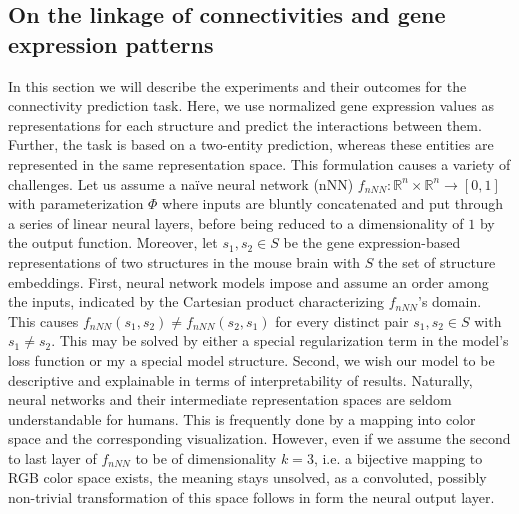 \documentclass[]{article}
\begin{document}
\subsection{On the linkage of connectivities and gene expression patterns}
\label{sec:results_connpred}
In this section we will describe the experiments and their outcomes for the connectivity prediction task. Here, we use normalized gene expression values as representations for each structure and predict the interactions between them. Further, the task is based on a two-entity prediction, whereas these entities are represented in the same representation space. 
This formulation causes a variety of challenges. Let us assume a na\"ive neural network (nNN) $f_{nNN}:\mathbb{R}^n\times \mathbb{R}^n\rightarrow [0,1]$ with parameterization $\Phi$ where inputs are bluntly concatenated and put through a series of linear neural layers, before being reduced to a dimensionality of $1$ by the output function. Moreover, let $s_1, s_2\in S$ be the gene expression-based representations of two structures in the mouse brain with $S$ the set of structure embeddings.
First, neural network models impose and assume an order among the inputs, indicated by the Cartesian product characterizing $f_{nNN}$'s domain. This causes $f_{nNN}(s_1, s_2)\neq f_{nNN}(s_2, s_1)$ for every distinct pair $s_1,s_2\in S$ with $s_1\neq s_2$. This may be solved by either a special regularization term in the model's loss function or my a special model structure. 
Second, we wish our model to be descriptive and explainable in terms of interpretability of results. Naturally, neural networks and their intermediate representation spaces are seldom understandable for humans. This is frequently done by a mapping into color space and the corresponding visualization. However, even if we assume the second to last layer of $f_{nNN}$ to be of dimensionality $k=3$, i.e. a bijective mapping to RGB color space exists, the meaning stays unsolved, as a convoluted, possibly non-trivial transformation of this space follows in form the neural output layer.\\
\end{document}
